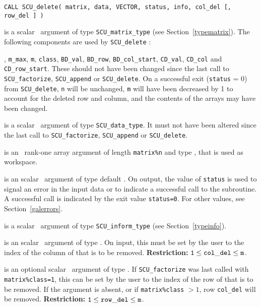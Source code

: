\documentclass{galahad}
\newcommand{\packagename}{SCU}
\begin{document}
\hskip0.5in 
{\tt CALL \packagename\_delete( matrix, data, VECTOR, status, info,  
col\_del [, row\_del ] )}

\vspace*{-2mm}
\begin{description}
 is a scalar \intentinout\ argument of type 
{\tt \packagename\_matrix\_type} 
(see Section~\ref{typematrix}). The following components are used by 
{\tt \packagename\_delete} : 
 
\begin{description} 
, {\tt m\_max}, {\tt m}, {\tt class},
{\tt BD\_val}, {\tt BD\_row}, {\tt BD\_col\_start}, 
{\tt CD\_val}, {\tt CD\_col} and {\tt CD\_row\_start}.  
These should not have been changed since the last call to 
{\tt \packagename\_factorize}, {\tt \packagename\_append} or 
{\tt \packagename\_delete}. 
On a successful exit ({\tt status} = 0) from {\tt \packagename\_delete},  
{\tt n} will be unchanged, {\tt m} will have 
been decreased by 1 to account for the deleted row and column, and 
the contents of the arrays may have been changed. 
\end{description} 
 
 is a scalar \intentinout\ argument of type 
{\tt \packagename\_data\_type}. 
It must not have been altered since the last call to  
{\tt \packagename\_factorize}, 
{\tt \packagename\_append} or 
{\tt \packagename\_delete}. 
 
 is an \intentout\ rank-one array argument of length 
{\tt matrix\%n} 
and type \realdp, that is used as workspace. 
 
 is an scalar \intentout\ argument of type default 
\integer. 
On output, the value of {\tt status} is used to signal an error 
in the input data or to indicate a successful call to the subroutine. 
A successful call is indicated by the exit value {\tt status=0}. 
For other values, see Section~\ref{galerrors}. 
 
 is a scalar \intentinout\ argument of type 
{\tt \packagename\_inform\_type} 
(see Section~\ref{typeinfo}). 
 
 is an scalar \intentin\ argument of type 
\integer. 
On input, this must be set by the user to the index of the column of 
 that is to be removed.  
{\bf Restriction:} ${\tt 1} \leq {\tt col\_del} \leq {\tt m}$.
 
 is an optional scalar \intentin\ argument of type  
\integer. 
If {\tt \packagename\_factorize} was last called with {\tt matrix\%class=1}, 
this can be set by the user to the index of  
the row of  that is to be removed. If the argument is absent, or if 
{\tt  matrix\%class} $> 1$, row {\tt col\_del} will be removed. 
{\bf Restriction:} ${\tt 1} \leq {\tt row\_del} \leq {\tt m}$. 

\end{description}
\end{document}

